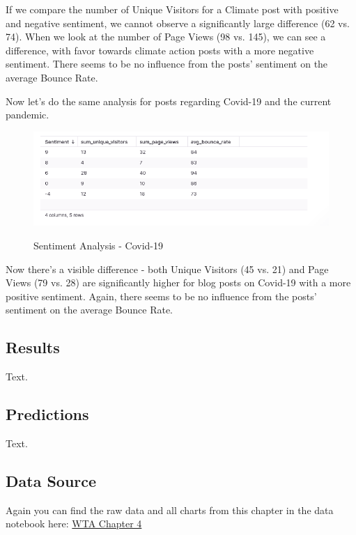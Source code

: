 If we compare the number of Unique Visitors for a Climate post with positive and negative sentiment, we cannot observe a significantly large difference (62 vs. 74). When we look at the number of Page Views (98 vs. 145), we can see a difference, with favor towards climate action posts with a more negative sentiment. There seems to be no influence from the posts' sentiment on the average Bounce Rate.

Now let's do the same analysis for posts regarding Covid-19 and the current pandemic.

\begin{figure}[H]
\centering
\caption {Sentiment Analysis - Covid-19}
\includegraphics[width=\linewidth]{images/analysis-sentiment-covid.png}
\label{fig:sentimentCovid}
\end{figure}

Now there's a visible difference - both Unique Visitors (45 vs. 21) and Page Views (79 vs. 28) are significantly higher for blog posts on Covid-19 with a more positive sentiment. Again, there seems to be no influence from the posts' sentiment on the average Bounce Rate.

\subsection{Results}

Text.

\subsection{Predictions}

Text.

\subsection{Data Source}

Again you can find the raw data and all charts from this chapter in the data notebook here: \href{https://plausible.io/chfrank.net}{WTA Chapter 4}
